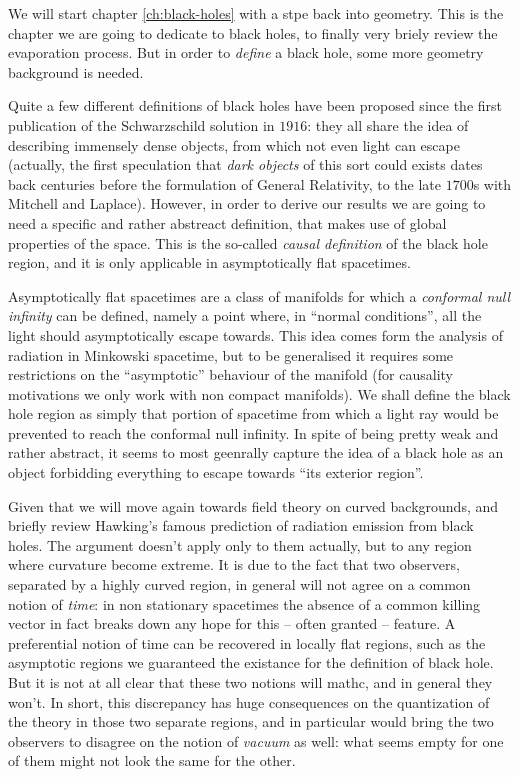 We will start chapter \ref{ch:black-holes} with a stpe back into geometry. This is the chapter we are going to dedicate to black holes, to finally very briely review the evaporation process. But in order to \emph{define} a black hole, some more geometry background is needed. 

Quite a few different definitions of black holes have been proposed since the first publication of the Schwarzschild solution in \(1916\): they all share the idea of describing immensely dense objects, from which not even light can escape (actually, the first speculation that \emph{dark objects} of this sort could exists dates back centuries before the formulation of General Relativity, to the late \(1700\)s with Mitchell and Laplace). However, in order to derive our results we are going to need a specific and rather abstreact definition, that makes use of global properties of the space. This is the so-called \emph{causal definition} of the black hole region, and it is only applicable in asymptotically flat spacetimes.

Asymptotically flat spacetimes are a class of manifolds for which a \emph{conformal null infinity} can be defined, namely a point where, in ``normal conditions'', all the light should asymptotically escape towards. This idea comes form the analysis of radiation in Minkowski spacetime, but to be generalised it requires some restrictions on the ``asymptotic'' behaviour of the manifold (for causality motivations we only work with non compact manifolds). We shall define the black hole region as simply that portion of spacetime from which a light ray would be prevented to reach the conformal null infinity. In spite of being pretty weak and rather abstract, it seems to most geenrally capture the idea of a black hole as an object forbidding everything to escape towards ``its exterior region''.

Given that we will move again towards field theory on curved backgrounds, and briefly review Hawking's famous prediction of radiation emission from black holes. The argument doesn't apply only to them actually, but to any region where curvature become extreme. It is due to the fact that two observers, separated by a highly curved region, in general will not agree on a common notion of \emph{time}: in non stationary spacetimes the absence of a common killing vector in fact breaks down any hope for this -- often granted -- feature. A preferential notion of time can be recovered in locally flat regions, such as the asymptotic regions we guaranteed the existance for the definition of black hole. But it is not at all clear that these two notions will mathc, and in general they won't. In short, this discrepancy has huge consequences on the quantization of the theory in those two separate regions, and in particular would bring the two observers to disagree on the notion of \emph{vacuum} as well: what seems empty for one of them might not look the same for the other. 

